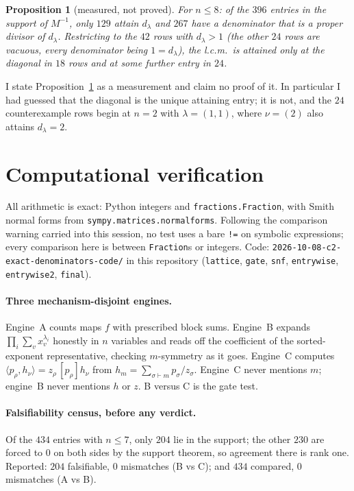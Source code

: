 \documentclass[11pt]{article}
\newtheorem{proposition}[theorem]{Proposition}
\theoremstyle{definition}
\newcommand{\lam}{\lambda}
\begin{document}
\begin{proposition}[measured, not proved]\label{prop:measured}
For $n\le8$: of the $396$ entries in the support of $M^{-1}$, only $129$ attain $d_\lam$ and $267$
have a denominator that is a proper divisor of $d_\lam$. Restricting to the $42$ rows with
$d_\lam>1$ (the other $24$ rows are vacuous, every denominator being $1=d_\lam$), the l.c.m.\ is
attained \emph{only} at the diagonal in $18$ rows and at some further entry in $24$.
\end{proposition}

I state Proposition~\ref{prop:measured} as a measurement and claim no proof of it. In particular I had
guessed that the diagonal is the unique attaining entry; it is not, and the $24$ counterexample rows
begin at $n=2$ with $\lam=(1,1)$, where $\nu=(2)$ also attains $d_\lam=2$.

\section{Computational verification}\label{sec:verif}

All arithmetic is exact: Python integers and \texttt{fractions.Fraction}, with Smith normal forms from
\texttt{sympy.matrices.normalforms}. Following the comparison warning carried into this session, no
test uses a bare \verb|!=| on symbolic expressions; every comparison here is between
\texttt{Fraction}s or integers. Code: \texttt{2026-10-08-c2-exact-denominators-code/} in this repository (\texttt{lattice}, \texttt{gate}, \texttt{snf}, \texttt{entrywise}, \texttt{entrywise2}, \texttt{final}).

\paragraph{Three mechanism-disjoint engines.} Engine~A counts maps $f$ with prescribed block sums.
Engine~B expands $\prod_i\sum_v x_v^{\lam_i}$ honestly in $n$ variables and reads off the coefficient
of the sorted-exponent representative, checking $m$-symmetry as it goes. Engine~C computes
$\langle p_\rho,h_\nu\rangle=z_\rho\,[p_\rho]h_\nu$ from $h_m=\sum_{\sigma\vdash m}p_\sigma/z_\sigma$.
Engine~C never mentions $m$; engine~B never mentions $h$ or $z$. B versus C is the gate test.

\paragraph{Falsifiability census, before any verdict.} Of the $434$ entries with $n\le7$, only $204$
lie in the support; the other $230$ are forced to $0$ on both sides by the support theorem, so
agreement there is rank one. Reported: $204$ falsifiable, $0$ mismatches (B vs C); and $434$
compared, $0$ mismatches (A vs B).
\end{document}
